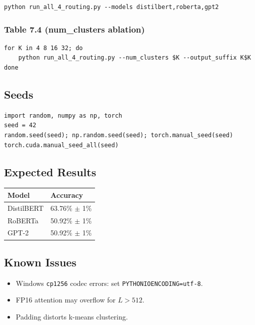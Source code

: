 \begin{lstlisting}
python run_all_4_routing.py --models distilbert,roberta,gpt2
\end{lstlisting}

\subsubsection{Table 7.4 (num\_clusters ablation)}

\begin{lstlisting}
for K in 4 8 16 32; do
    python run_all_4_routing.py --num_clusters $K --output_suffix K$K
done
\end{lstlisting}

\subsection{Seeds}

\begin{lstlisting}
import random, numpy as np, torch
seed = 42
random.seed(seed); np.random.seed(seed); torch.manual_seed(seed)
torch.cuda.manual_seed_all(seed)
\end{lstlisting}

\subsection{Expected Results}

\begin{table}[H]
\centering
\small
\begin{tabular}{ll}
\toprule
\textbf{Model} & \textbf{Accuracy} \\
\midrule
DistilBERT & 63.76\% $\pm$ 1\% \\
RoBERTa & 50.92\% $\pm$ 1\% \\
GPT-2 & 50.92\% $\pm$ 1\% \\
\bottomrule
\end{tabular}
\end{table}

\subsection{Known Issues}

\begin{itemize}
\item Windows \texttt{cp1256} codec errors: set \texttt{PYTHONIOENCODING=utf-8}.
\item FP16 attention may overflow for $L > 512$.
\item Padding distorts k-means clustering.

\end{itemize}

